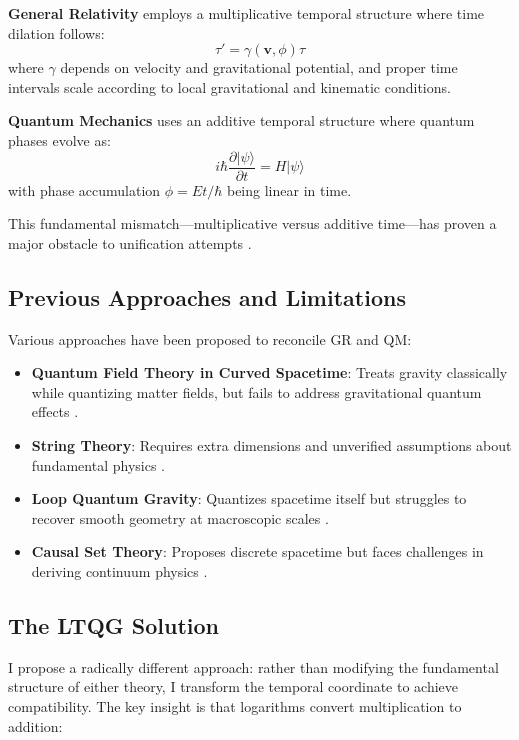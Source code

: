 \documentclass[12pt,a4paper]{article}
\begin{document}
\textbf{General Relativity} employs a multiplicative temporal structure where time dilation follows:
\begin{equation}
\tau' = \gamma(\mathbf{v}, \phi) \tau
\label{eq:gr_time}
\end{equation}
where $\gamma$ depends on velocity and gravitational potential, and proper time intervals scale according to local gravitational and kinematic conditions.

\textbf{Quantum Mechanics} uses an additive temporal structure where quantum phases evolve as:
\begin{equation}
i\hbar \frac{\partial |\psi\rangle}{\partial t} = H |\psi\rangle
\label{eq:qm_evolution}
\end{equation}
with phase accumulation $\phi = Et/\hbar$ being linear in time.

This fundamental mismatch—multiplicative versus additive time—has proven a major obstacle to unification attempts \cite{Wheeler1989, Penrose2004, Ashtekar2011}.

\subsection{Previous Approaches and Limitations}

Various approaches have been proposed to reconcile GR and QM:

\begin{itemize}
\item \textbf{Quantum Field Theory in Curved Spacetime}: Treats gravity classically while quantizing matter fields, but fails to address gravitational quantum effects \cite{Birrell1982}.
\item \textbf{String Theory}: Requires extra dimensions and unverified assumptions about fundamental physics \cite{Green1987}.
\item \textbf{Loop Quantum Gravity}: Quantizes spacetime itself but struggles to recover smooth geometry at macroscopic scales \cite{Rovelli2004}.
\item \textbf{Causal Set Theory}: Proposes discrete spacetime but faces challenges in deriving continuum physics \cite{Bombelli1987}.
\end{itemize}

\subsection{The LTQG Solution}

I propose a radically different approach: rather than modifying the fundamental structure of either theory, I transform the temporal coordinate to achieve compatibility. The key insight is that logarithms convert multiplication to addition:
\end{document}
